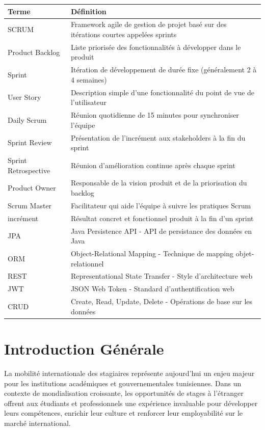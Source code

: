 \documentclass[12pt,a4paper]{report}
\begin{document}
\begin{tabular}{|p{4cm}|p{10cm}|}
\hline
\textbf{Terme} & \textbf{Définition} \\
\hline
SCRUM & Framework agile de gestion de projet basé sur des itérations courtes appelées sprints \\
\hline
Product Backlog & Liste priorisée des fonctionnalités à développer dans le produit \\
\hline
Sprint & Itération de développement de durée fixe (généralement 2 à 4 semaines) \\
\hline
User Story & Description simple d'une fonctionnalité du point de vue de l'utilisateur \\
\hline
Daily Scrum & Réunion quotidienne de 15 minutes pour synchroniser l'équipe \\
\hline
Sprint Review & Présentation de l'incrément aux stakeholders à la fin du sprint \\
\hline
Sprint Retrospective & Réunion d'amélioration continue après chaque sprint \\
\hline
Product Owner & Responsable de la vision produit et de la priorisation du backlog \\
\hline
Scrum Master & Facilitateur qui aide l'équipe à suivre les pratiques Scrum \\
\hline
 incrément & Résultat concret et fonctionnel produit à la fin d'un sprint \\
\hline
JPA & Java Persistence API - API de persistance des données en Java \\
\hline
ORM & Object-Relational Mapping - Technique de mapping objet-relationnel \\
\hline
REST & Representational State Transfer - Style d'architecture web \\
\hline
JWT & JSON Web Token - Standard d'authentification web \\
\hline
CRUD & Create, Read, Update, Delete - Opérations de base sur les données \\
\hline
\end{tabular}

\chapter*{Introduction Générale}


La mobilité internationale des stagiaires représente aujourd'hui un enjeu majeur pour les institutions académiques et gouvernementales tunisiennes. Dans un contexte de mondialisation croissante, les opportunités de stages à l'étranger offrent aux étudiants et professionnels une expérience invaluable pour développer leurs compétences, enrichir leur culture et renforcer leur employabilité sur le marché international.
\end{document}
